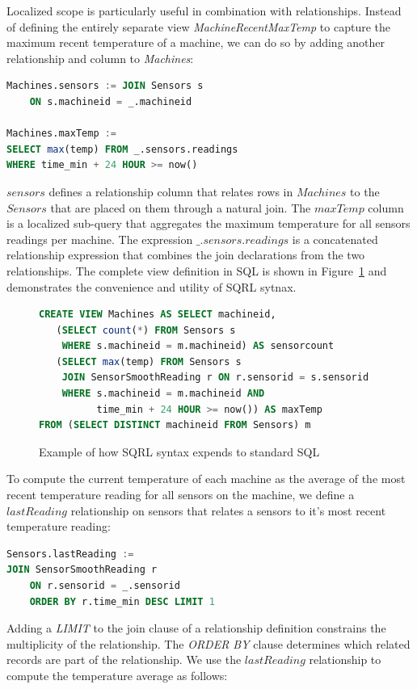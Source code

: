 \documentclass[	DIV=calc,%
							paper=letter,%
							fontsize=11pt,%
							twocolumn]{scrartcl}	 					%
\begin{document}
Localized scope is particularly useful in combination with relationships. Instead of defining the entirely separate view \emph{MachineRecentMaxTemp} to capture the maximum recent temperature of a machine, we can do so by adding another relationship and column to \emph{Machines}:

\begin{lstlisting}[language=SQL]
Machines.sensors := JOIN Sensors s
    ON s.machineid = _.machineid

Machines.maxTemp :=
SELECT max(temp) FROM _.sensors.readings
WHERE time_min + 24 HOUR >= now()
\end{lstlisting}

$sensors$ defines a relationship column that relates rows in $Machines$ to the $Sensors$ that are placed on them through a natural join. The $maxTemp$ column is a localized sub-query that aggregates the maximum temperature for all sensors readings per machine. The expression $\_.sensors.readings$ is a concatenated relationship expression that combines the join declarations from the two relationships.
The complete view definition in SQL is shown in Figure~\ref{fig:machinesView} and demonstrates the convenience and utility of SQRL sytnax.

\begin{figure}
\begin{lstlisting}[language=SQL]
CREATE VIEW Machines AS SELECT machineid,
   (SELECT count(*) FROM Sensors s
    WHERE s.machineid = m.machineid) AS sensorcount
   (SELECT max(temp) FROM Sensors s
    JOIN SensorSmoothReading r ON r.sensorid = s.sensorid
    WHERE s.machineid = m.machineid AND
          time_min + 24 HOUR >= now()) AS maxTemp
FROM (SELECT DISTINCT machineid FROM Sensors) m
\end{lstlisting}
\caption{Example of how SQRL syntax expends to standard SQL}
\label{fig:machinesView}
\end{figure}

To compute the current temperature of each machine as the average of the most recent temperature reading for all sensors on the machine, we define a $lastReading$ relationship on sensors that relates a sensors to it's most recent temperature reading:

\begin{lstlisting}[language=SQL]
Sensors.lastReading :=
JOIN SensorSmoothReading r
    ON r.sensorid = _.sensorid
    ORDER BY r.time_min DESC LIMIT 1
\end{lstlisting}

Adding a \emph{LIMIT} to the join clause of a relationship definition constrains the multiplicity of the relationship. The \emph{ORDER BY} clause determines which related records are part of the relationship. We use the $lastReading$ relationship to compute the temperature average as follows:
\end{document}
